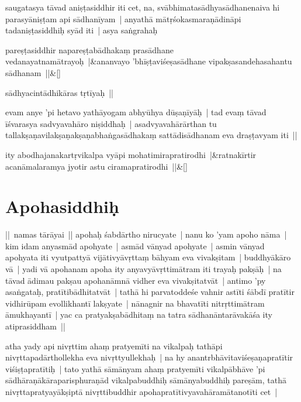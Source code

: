 \documentclass[article,12pt,a4paper]{memoir}
\begin{document}
	  \pstart saugatasya tāvad aniṣṭasiddhir iti cet, na, svābhimatasādhyasādhanenaiva hi parasyāniṣṭam api sādhanīyam | anyathā mātṛśokasmaraṇādināpi tadaniṣṭasiddhiḥ syād iti | asya saṅgrahaḥ
	\pend
      
	    
	    \stanza[\smallbreak]
	pareṣṭasiddhir napareṣṭabādhakaṃ prasādhane vedanayatnamātrayoḥ |&ananvayo 'bhīṣṭaviśeṣasādhane vipakṣasandehasahantu sādhanam ||\&[\smallbreak]


	\label{īsd-sādhyacintā}
	  
	

	  \pstart sādhyacintādhikāras tṛtīyaḥ ||
	\pend
      

	  \pstart evam anye 'pi hetavo yathāyogam abhyūhya dūṣaṇīyāḥ | tad evaṃ tāvad īśvarasya sadvyavahāro niṣiddhaḥ | asadvyavahārārthan tu tallakṣaṇavilakṣaṇakṣaṇabhaṅgasādhakaṃ sattādisādhanam eva draṣṭavyam iti ||\leavevmode{}\label{RNAms_32B1}
	\pend
      
	    
	    \stanza[\smallbreak]
	\label{thakur75-57.14}ity abodhajanakartṛvikalpa vyāpi mohatimirapratirodhi |&ratnakīrtir acanāmalaramya jyotir astu ciramapratirodhi ||\&[\smallbreak]


	
	  
	
\section[{Apohasiddhiḥ}]{Apohasiddhiḥ}\label{Apohasiddhiḥ}

	  \pstart || namas tārāyai || \label{thakur75-58.5} apohaḥ śabdārtho nirucyate | nanu ko 'yam apoho nāma | kim idam anyasmād apohyate | asmād vānyad apohyate | asmin vānyad apohyata iti vyutpattyā vijātivyāvṛttaṃ bāhyam eva vivakṣitam | buddhyākāro vā | yadi vā apohanam apoha ity anyavyāvṛttimātram iti trayaḥ pakṣāḥ | \label{thakur75-58.9} na tāvad ādimau pakṣau apohanāmnā vidher eva vivakṣitatvāt | antimo 'py asaṅgataḥ, pratītibādhitatvāt | tathā hi parvatoddeśe vahnir astīti śābdī pratītir vidhirūpam evollikhantī lakṣyate | nānagnir na bhavatīti nitrṛttimātram āmukhayantī | yac ca pratyakṣabādhitaṃ na tatra sādhanāntarāvakāśa ity atiprasiddham ||
	\pend
      

	  \pstart atha yady api nivṛttim ahaṃ pratyemīti na vikalpaḥ tathāpi nivṛttapadārthollekha eva nivṛttyullekhaḥ | na hy anantrbhāvitaviśeṣaṇapratītir viśiṣṭapratītiḥ | tato yathā sāmānyam ahaṃ pratyemīti vikalpābhāve 'pi sādhāraṇākāraparisphuraṇād vikalpabuddhiḥ sāmānyabuddhiḥ pareṣām, tathā nivṛttapratyayākṣiptā nivṛttibuddhir apohapratītivyavahāramātanotīti cet |
	\pend
      
\end{document}
